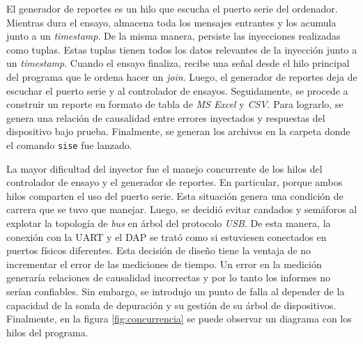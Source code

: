 El generador de reportes es un hilo que escucha el puerto serie del ordenador.
Mientras dura el ensayo, almacena toda los mensajes entrantes y los acumula junto a un \emph{timestamp}.
De la misma manera, persiste las inyecciones realizadas como tuplas.
Estas tuplas tienen todos los datos relevantes de la inyección junto a un \emph{timestamp}.
Cuando el ensayo finaliza, recibe una señal desde el hilo principal del programa que le ordena hacer un \emph{join}.
Luego, el generador de reportes deja de escuchar el puerto serie y al controlador de ensayos.
Seguidamente, se procede a construir un reporte en formato de tabla de \emph{MS Excel} y \emph{CSV}.
Para lograrlo, se genera una relación de causalidad entre errores inyectados y respuestas del dispositivo bajo prueba.
Finalmente, se generan los archivos en la carpeta donde el comando \texttt{sise} fue lanzado.


La mayor dificultad del inyector fue el manejo concurrente de los hilos del controlador de ensayo y el generador de reportes.
En particular, porque ambos hilos comparten el uso del puerto serie.
Esta situación genera una condición de carrera que se tuvo que manejar.
Luego, se decidió evitar candados y semáforos al explotar la topología de \emph{bus} en árbol del protocolo \emph{USB}.
De esta manera, la conexión con la UART y el DAP se trató como si estuviesen conectados en puertos físicos diferentes.
Esta decisión de diseño tiene la ventaja de no incrementar el error de las mediciones de tiempo.
Un error en la medición generaría relaciones de causalidad incorrectas y por lo tanto los informes no serían confiables.
Sin embargo, se introdujo un punto de falla al depender de la capacidad de la sonda de depuración y su gestión de su árbol de dispositivos.
Finalmente, en la figura \ref{fig:concurrencia} se puede observar un diagrama con los hilos del programa.

